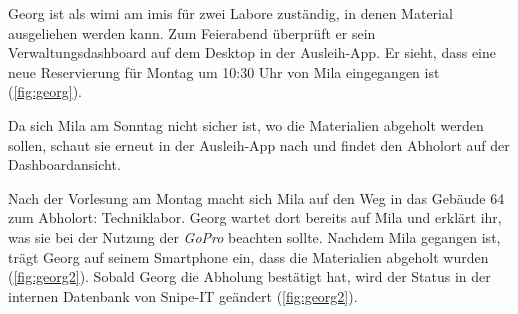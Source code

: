 Georg ist als \ac{wimi} am \ac{imis} für zwei Labore zuständig, in
denen Material ausgeliehen werden kann. Zum Feierabend überprüft er sein
Verwaltungsdashboard auf dem Desktop in der Ausleih-App. Er sieht, dass eine neue
Reservierung für Montag um 10:30 Uhr von Mila eingegangen ist (\ref{fig:georg}).

Da sich Mila am Sonntag nicht sicher ist, wo die Materialien abgeholt werden
sollen, schaut sie erneut in der Ausleih-App nach und findet den Abholort auf
der Dashboardansicht.

Nach der Vorlesung am Montag macht sich Mila auf den Weg in das Gebäude 64 zum
Abholort: Techniklabor. Georg wartet dort bereits auf Mila und erklärt ihr, was
sie bei der Nutzung der \textit{GoPro} beachten sollte. Nachdem Mila gegangen ist, trägt
Georg auf seinem Smartphone ein, dass die Materialien abgeholt wurden (\ref{fig:georg2}). Sobald
Georg die Abholung bestätigt hat, wird der Status in der internen Datenbank von
Snipe-IT geändert (\ref{fig:georg2}).

